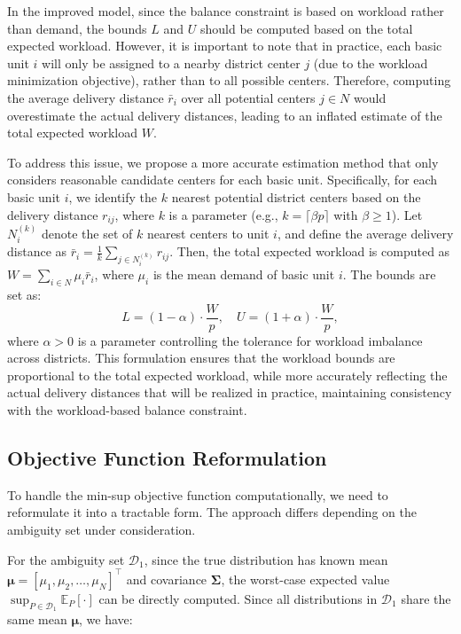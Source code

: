 \documentclass[preprint,12pt,authoryear]{elsarticle}
\begin{document}
In the improved model, since the balance constraint is based on workload rather than demand, the bounds $L$ and $U$ should be computed based on the total expected workload. However, it is important to note that in practice, each basic unit $i$ will only be assigned to a nearby district center $j$ (due to the workload minimization objective), rather than to all possible centers. Therefore, computing the average delivery distance $\bar{r}_i$ over all potential centers $j \in N$ would overestimate the actual delivery distances, leading to an inflated estimate of the total expected workload $W$.

To address this issue, we propose a more accurate estimation method that only considers reasonable candidate centers for each basic unit. Specifically, for each basic unit $i$, we identify the $k$ nearest potential district centers based on the delivery distance $r_{ij}$, where $k$ is a parameter (e.g., $k = \lceil \beta p \rceil$ with $\beta \geq 1$). Let $N_i^{(k)}$ denote the set of $k$ nearest centers to unit $i$, and define the average delivery distance as $\bar{r}_i = \frac{1}{k} \sum_{j \in N_i^{(k)}} r_{ij}$. Then, the total expected workload is computed as $W = \sum_{i \in N} \mu_i \bar{r}_i$, where $\mu_i$ is the mean demand of basic unit $i$. The bounds are set as:
\begin{equation}
L = (1 - \alpha) \cdot \frac{W}{p}, \quad U = (1 + \alpha) \cdot \frac{W}{p},
\end{equation}
where $\alpha > 0$ is a parameter controlling the tolerance for workload imbalance across districts. This formulation ensures that the workload bounds are proportional to the total expected workload, while more accurately reflecting the actual delivery distances that will be realized in practice, maintaining consistency with the workload-based balance constraint.

\subsection{Objective Function Reformulation}

To handle the min-sup objective function computationally, we need to reformulate it into a tractable form. The approach differs depending on the ambiguity set under consideration.

For the ambiguity set $\mathcal{D}_1$, since the true distribution has known mean $\boldsymbol{\mu} = [\mu_1, \mu_2, \ldots, \mu_N]^\top$ and covariance $\boldsymbol{\Sigma}$, the worst-case expected value $\sup_{P \in \mathcal{D}_1} \mathbb{E}_P[\cdot]$ can be directly computed. Since all distributions in $\mathcal{D}_1$ share the same mean $\boldsymbol{\mu}$, we have:
\end{document}

